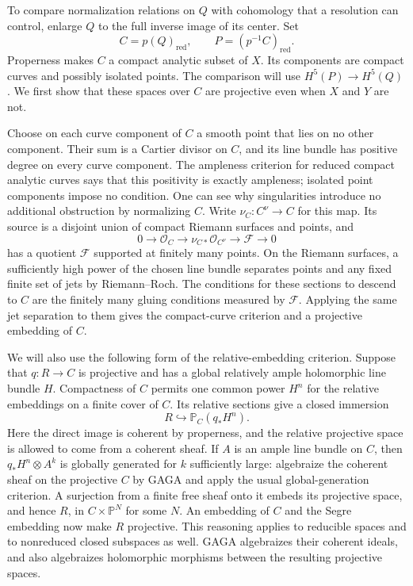 To compare normalization relations on $Q$ with cohomology that a
resolution can control, enlarge $Q$ to the full inverse image of its
center.  Set
\begin{equation}\label{eq:branch-projective-loci}
 C=p(Q)_{\mathrm{red}},\qquad
 P=(p^{-1}C)_{\mathrm{red}}.
\end{equation}
Properness makes $C$ a compact analytic subset of $X$.  Its components
are compact curves and possibly isolated points.  The comparison will
use $H^5(P)\to H^5(Q)$.  We first show that these spaces over $C$ are
projective even when $X$ and $Y$ are not.

Choose on each curve component of $C$ a smooth point that lies on no
other component.  Their sum is a Cartier divisor on $C$, and its line
bundle has positive degree on every curve component.  The ampleness
criterion for reduced compact analytic curves says that this positivity
is exactly ampleness; isolated point components impose no condition.
One can see why singularities introduce no additional obstruction by
normalizing $C$.  Write $\nu_C\colon C^\nu\to C$ for this map.  Its
source is a disjoint union of compact Riemann surfaces and points, and
\[
 0\longrightarrow\mathcal O_C\longrightarrow
   \nu_{C*}\mathcal O_{C^\nu}\longrightarrow\mathcal F\longrightarrow0
\]
has a quotient $\mathcal F$ supported at finitely many points.  On the
Riemann surfaces, a sufficiently high power of the chosen line bundle
separates points and any fixed finite set of jets by Riemann--Roch.
The conditions for these sections to descend to $C$ are the finitely
many gluing conditions measured by $\mathcal F$.  Applying the same
jet separation to them gives the compact-curve criterion and a
projective embedding of $C$.

We will also use the following form of the relative-embedding
criterion.  Suppose that $q\colon R\to C$ is projective and has a
global relatively ample holomorphic line bundle $H$.  Compactness of
$C$ permits one common power $H^n$ for the relative embeddings on a
finite cover of $C$.  Its relative sections give a closed immersion
\[
 R\hookrightarrow\mathbb P_C(q_*H^n).
\]
Here the direct image is coherent by properness, and the relative
projective space is allowed to come from a coherent sheaf.  If $A$ is
an ample line bundle on $C$, then $q_*H^n\otimes A^k$ is globally
generated for $k$ sufficiently large: algebraize the coherent sheaf
on the projective $C$ by GAGA
\cite[Section~12, Theorems~1--3]{SerreGAGA} and apply the usual global-generation
criterion.  A surjection from a finite free sheaf onto it embeds its
projective space, and hence $R$, in $C\times\mathbb P^N$ for some
$N$.  An embedding of $C$ and the Segre embedding now make $R$
projective.  This reasoning applies to reducible spaces and to
nonreduced closed subspaces as well.  GAGA algebraizes their coherent
ideals, and also algebraizes holomorphic morphisms between the resulting
projective spaces.

